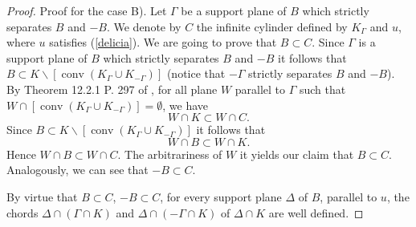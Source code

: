 \documentclass[12pt]{amsart}
\newcommand{\conv}{\operatorname*{conv}}
\begin{document}
\begin{proof}
                   Proof for the case B). Let $\Gamma$ be a support plane of $B$ which strictly 
                   separates $B$ and $-B$. We denote by $C$ the infinite cylinder defined by 
                   $K_{\Gamma}$ and $u$, where $u$ satisfies (\ref{delicia}). We are going to prove 
                   that $B\subset C$. Since $\Gamma$ is a support plane of $B$ which strictly 
                   separates $B$ and $-B$ it follows that 
                   $B\subset K\backslash [\conv (K_{\Gamma}\cup K_{-\Gamma})]$ 
                   (notice that $-\Gamma$  strictly separates $B$ and $-B$). By Theorem 12.2.1 P. 297 
                   of \cite{Matousek}, for all plane $W$ parallel to $\Gamma$ such that 
                   $ W \cap [\conv (K_{\Gamma}\cup K_{-\Gamma})]=\emptyset$, we have 
\[
                   W\cap K\subset W\cap C.                   
\]
                   Since $B\subset K\backslash [\conv (K_{\Gamma}\cup K_{-\Gamma})]$ 
                   it follows that
\[
                   W \cap B\subset W\cap K.
\]
                   Hence $W \cap B\subset W\cap C$. The arbitrariness of $W$ it yields our claim 
                   that $B\subset C$. Analogously, we can see that  $-B\subset C$.

                    By virtue that $B\subset C$,  $-B\subset C$, for every support plane $\Delta$ 
                    of $B$, parallel to $u$, the chords $\Delta \cap (\Gamma \cap K)$ and 
                    $ \Delta \cap (-\Gamma \cap K)$ of $\Delta \cap K$ are well defined.
                   

\end{proof}
\end{document}
